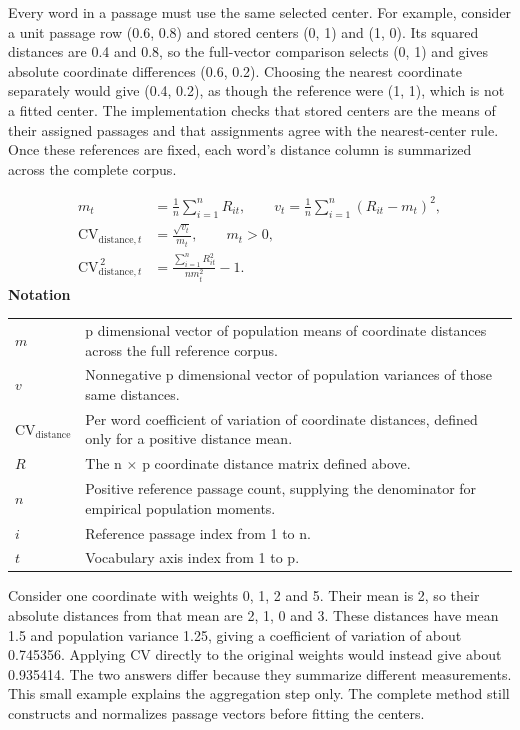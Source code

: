 \documentclass[10pt,letterpaper]{article}
\newcommand{\notlabel}{\noindent\textbf{Notation}\par\nobreak\vspace{4pt}}
\begin{document}
Every word in a passage must use the same selected center. For example, consider a unit passage row (0.6, 0.8) and stored centers (0, 1) and (1, 0). Its squared distances are 0.4 and 0.8, so the full-vector comparison selects (0, 1) and gives absolute coordinate differences (0.6, 0.2). Choosing the nearest coordinate separately would give (0.4, 0.2), as though the reference were (1, 1), which is not a fitted center. The implementation checks that stored centers are the means of their assigned passages and that assignments agree with the nearest-center rule. Once these references are fixed, each word's distance column is summarized across the complete corpus.\par

\par\noindent\begin{minipage}{\linewidth}
\begin{equation}\label{eq:distancecv}
\begin{aligned}m_t&=\frac1n\sum_{i=1}^{n}R_{it},\qquad v_t=\frac1n\sum_{i=1}^{n}(R_{it}-m_t)^2,\\\mathrm{CV}_{\mathrm{distance},t}&=\frac{\sqrt{v_t}}{m_t},\qquad m_t>0,\\\mathrm{CV}_{\mathrm{distance},t}^{\,2}&=\frac{\sum_{i=1}^{n}R_{it}^2}{n m_t^2}-1.\end{aligned}
\end{equation}
\notlabel
{\fontsize{8.5}{10.5}\selectfont\setlength{\tabcolsep}{0pt}\renewcommand{\arraystretch}{1.12}
\begin{tabularx}{\linewidth}{@{}p{.14\linewidth}X@{}}
$m$ & p dimensional vector of population means of coordinate distances across the full reference corpus.\\
$v$ & Nonnegative p dimensional vector of population variances of those same distances.\\
$\mathrm{CV}_{\mathrm{distance}}$ & Per word coefficient of variation of coordinate distances, defined only for a positive distance mean.\\
$R$ & The n \ensuremath{\times} p coordinate distance matrix defined above.\\
$n$ & Positive reference passage count, supplying the denominator for empirical population moments.\\
$i$ & Reference passage index from 1 to n.\\
$t$ & Vocabulary axis index from 1 to p.\\
\end{tabularx}}
\par\vspace{2pt}
\end{minipage}\par
Consider one coordinate with weights 0, 1, 2 and 5. Their mean is 2, so their absolute distances from that mean are 2, 1, 0 and 3. These distances have mean 1.5 and population variance 1.25, giving a coefficient of variation of about 0.745356. Applying CV directly to the original weights would instead give about 0.935414. The two answers differ because they summarize different measurements. This small example explains the aggregation step only. The complete method still constructs and normalizes passage vectors before fitting the centers.\par
\end{document}
